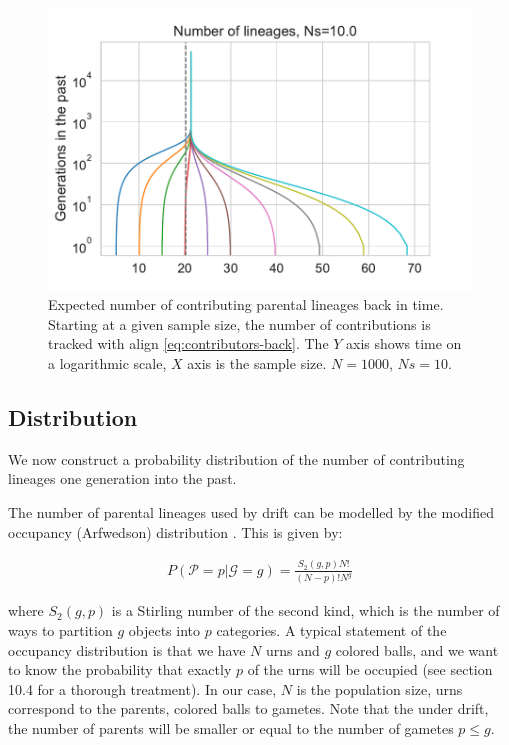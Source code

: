 \documentclass[review]{elsarticle}
\begin{document}
\begin{figure}
  \centering
  \includegraphics[]{fig/bell-plot.pdf}
  \caption{Expected number of contributing parental lineages back in time. Starting at a given
    sample size, the number of contributions is tracked with align \ref{eq:contributors-back}.
    The $Y$ axis shows time on a logarithmic scale, $X$ axis is the sample size. $N=1000$, $Ns=10$.}
  \label{fig:bell-plot}
\end{figure}


\subsection{Distribution}
\label{subsec:distribution}

We now construct a probability distribution of the number of contributing lineages one generation
into the past.

The number of parental lineages used by drift can be modelled by the modified occupancy
(Arfwedson) distribution \cite{Wakeley2009,ONeill2019,JohnsonEtAl2005}. This is given by:

\begin{align}
  \label{eq:occupancy}
  P(\mathcal{P}=p|\mathcal{G}=g) = \frac{S_2(g,p) N!}{(N-p)! N^g}
\end{align}

where $S_2(g,p)$ is a Stirling number of the second kind, which is the number of ways to partition
$g$ objects into $p$ categories. A typical statement of the occupancy distribution is that we have
$N$ urns and $g$ colored balls, and we want to know the probability that exactly $p$ of the urns
will be occupied (see \cite{JohnsonEtAl2005} section 10.4 for a thorough treatment). In our case,
$N$ is the population size, urns correspond to the parents, colored balls to gametes. Note that the
under drift, the number of parents will be smaller or equal to the number of gametes $p \le g$.
\end{document}
